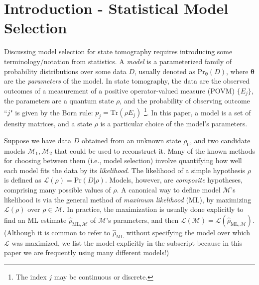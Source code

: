 \documentclass[aps,pra, twocolumn]{revtex4-1}
\newcommand{\bs}[1]{\boldsymbol{#1}}
\newcommand{\M}{\mathcal{M}}
\newcommand{\cL}{\mathcal{L}}
\begin{document}
\section{Introduction - Statistical Model Selection}
\label{sec:intro}
Discussing model selection for state tomography requires introducing some terminology/notation from statistics.  A \emph{model} is a parameterized family of probability distributions over some data $D$, usually denoted as $\mathrm{Pr}_{\bs{\theta}}(D)$, where $\bs{\theta}$ are the \emph{parameters} of the model. In state tomography, the data are the observed outcomes of a measurement of a positive operator-valued measure (POVM) $\{E_{j}\}$, the parameters are a quantum state $\rho$, and the probability of observing outcome ``$j$" is given by the Born rule: $p_{j} = \mathrm{Tr}(\rho E_{j})$ \footnote{The index $j$ may be continuous or discrete.}. In this paper, a model is a set of density matrices, and a state $\rho$ is a particular choice of the model's parameters.

Suppose we have data $D$ obtained from an unknown state $\rho_{0}$, and two candidate models $\M_{1}, \M_{2}$ that could be used to reconstruct it.  Many of the known methods for choosing between them (i.e., model selection) involve quantifying how well each model fits the data by its \emph{likelihood}.  The likelihood of a simple hypothesis $\rho$ is defined as $\mathcal{L}(\rho) = \mathrm{Pr}(D|\rho)$.  Models, however, are \emph{composite} hypotheses, comprising many possible values of $\rho$.  A canonical way to define model $\M$'s likelihood is via the general method of \emph{maximum likelihood} (ML), by maximizing $\cL(\rho)$ over $\rho\in\M$.  In practice, the maximization is usually done explicitly to find an ML estimate $\hat{\rho}_{\mathrm{ML},\M}$ \cite{Hradil1997, JamesPRA2001, Blume-Kohout2010} of $\M$'s parameters, and then $\cL(\M) = \cL(\hat{\rho}_{\mathrm{ML},\M})$.  (Although it is common to refer to $\hat\rho_{\mathrm{ML}}$ without specifying the model over which $\cL$ was maximized, we list the model explicitly in the subscript because in this paper we are frequently using many different models!)
\end{document}
